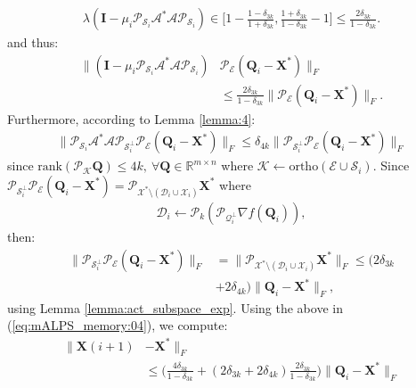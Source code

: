 \documentclass[twocolumn]{svjour3}
\newcommand{\vectornormbig}[1]{\big\|#1\big\|}
\newcommand{\sensing}{\boldsymbol{\mathcal{A}}}
\newcommand{\signal}{\boldsymbol{X}}
\newcommand{\bestsignal}{\boldsymbol{X}^\ast}
\newcommand{\dimension}{m \times n}
\newcommand{\id}{\mathbf{I}}
\newcommand{\rank}{k}
\begin{document}
\begin{align}
\lambda(\id - \mu_i\mathcal{P}_{\mathcal{S}_i}\sensing^\ast \sensing \mathcal{P}_{\mathcal{S}_i}) \in \Bigg[1 - \frac{1-\delta_{3\rank}}{1+\delta_{3\rank}}, \frac{1+\delta_{3\rank}}{1-\delta_{3\rank}} - 1\Bigg] \leq \frac{2\delta_{3\rank}}{1-\delta_{3\rank}}. \nonumber
\end{align} and thus:
\begin{align}
\vectornormbig{(\id - \mu_i\mathcal{P}_{\mathcal{S}_i}\sensing^\ast \sensing \mathcal{P}_{\mathcal{S}_i})&\mathcal{P}_{\mathcal{E}}(\boldsymbol{Q}_i - \bestsignal)}_F \nonumber \\ &\leq \frac{2\delta_{3\rank}}{1-\delta_{3\rank}} \vectornormbig{\mathcal{P}_{\mathcal{E}}(\boldsymbol{Q}_i - \bestsignal)}_F. \nonumber
\end{align} Furthermore, according to Lemma \ref{lemma:4}:
\begin{align}
\vectornormbig{\mathcal{P}_{\mathcal{S}_i}\sensing^\ast \sensing \mathcal{P}_{\mathcal{S}_i^{\bot}}\mathcal{P}_{\mathcal{E}}(\boldsymbol{Q}_i - \bestsignal)}_F \leq  \delta_{4\rank} \vectornormbig{\mathcal{P}_{\mathcal{S}_i^{\bot}}\mathcal{P}_{\mathcal{E}}(\boldsymbol{Q}_i - \bestsignal)}_F \nonumber
\end{align} since $ \text{rank}(\mathcal{P}_{\mathcal{K}}\boldsymbol{Q}) \leq 4\rank, ~\forall \boldsymbol{Q} \in \mathbb{R}^{\dimension} $ where $\mathcal{K} \leftarrow \text{ortho}(\mathcal{E} \cup \mathcal{S}_i)$. Since $ \mathcal{P}_{\mathcal{S}_i^{\bot}}\mathcal{P}_{\mathcal{E}}(\boldsymbol{Q}_i - \bestsignal) = \mathcal{P}_{\mathcal{X}^\ast \setminus (\mathcal{D}_i \cup \mathcal{X}_i)}\bestsignal $ where 
\begin{align}
\mathcal{D}_i \leftarrow\mathcal{P}_{k}\left(\mathcal{P}_{\mathcal{Q}_i^{\bot}}\nabla f(\boldsymbol{Q}_i)\right), \nonumber
\end{align} then:
\begin{align}
\vectornormbig{\mathcal{P}_{\mathcal{S}_i^{\bot}}\mathcal{P}_{\mathcal{E}}(\boldsymbol{Q}_i - \bestsignal)}_F &= \vectornormbig{\mathcal{P}_{\mathcal{X}^\ast \setminus (\mathcal{D}_i \cup \mathcal{X}_i)}\bestsignal}_F \leq (2\delta_{3\rank} \nonumber \\ &+ 2\delta_{4\rank})\vectornormbig{\boldsymbol{Q}_i - \bestsignal}_F,
\end{align} using Lemma \ref{lemma:act_subspace_exp}. Using the above in (\ref{eq:mALPS_memory:04}), we compute:
\begin{align}
\vectornormbig{\signal(i+1) &- \bestsignal}_F \nonumber \\ &\leq \Big(\frac{4\delta_{3\rank}}{1-\delta_{3\rank}} + (2\delta_{3\rank} + 2\delta_{4\rank})\frac{2\delta_{3\rank}}{1-\delta_{3\rank}}\Big) \vectornormbig{\boldsymbol{Q}_i - \bestsignal}_F \label{eq:mALPS0_memory:04}
\end{align}
\end{document}

